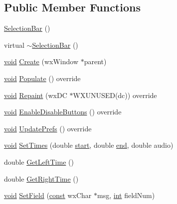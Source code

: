 \subsection*{Public Member Functions}
\begin{DoxyCompactItemize}
\item 
\hyperlink{class_selection_bar_a77f883e75a4fb5280f0a79ad17e8a549}{Selection\+Bar} ()
\item 
virtual \hyperlink{class_selection_bar_a216de1f19d68956a8b497d7d935e31f8}{$\sim$\+Selection\+Bar} ()
\item 
\hyperlink{sound_8c_ae35f5844602719cf66324f4de2a658b3}{void} \hyperlink{class_selection_bar_a9ee9a4f5516a7de59a2a10d3acc45302}{Create} (wx\+Window $\ast$parent)
\item 
\hyperlink{sound_8c_ae35f5844602719cf66324f4de2a658b3}{void} \hyperlink{class_selection_bar_aad76aa64d33dadda46eb02d2b326f66f}{Populate} () override
\item 
\hyperlink{sound_8c_ae35f5844602719cf66324f4de2a658b3}{void} \hyperlink{class_selection_bar_a9679aab7964d91a68105505c17cfcd90}{Repaint} (wx\+DC $\ast$W\+X\+U\+N\+U\+S\+ED(dc)) override
\item 
\hyperlink{sound_8c_ae35f5844602719cf66324f4de2a658b3}{void} \hyperlink{class_selection_bar_a5bb27fed7ba51a382a1b032247bbf9ab}{Enable\+Disable\+Buttons} () override
\item 
\hyperlink{sound_8c_ae35f5844602719cf66324f4de2a658b3}{void} \hyperlink{class_selection_bar_ada9ebc9106b6056dc284bfa099203d0c}{Update\+Prefs} () override
\item 
\hyperlink{sound_8c_ae35f5844602719cf66324f4de2a658b3}{void} \hyperlink{class_selection_bar_ae49fb2cbcf422fe4c719590013bacdc2}{Set\+Times} (double \hyperlink{seqread_8c_ac503262ae470564980711da4f78b1181}{start}, double \hyperlink{convtest_8m_afb358f48b1646c750fb9da6c6585be2b}{end}, double audio)
\item 
double \hyperlink{class_selection_bar_a1032e73abdeb1ffb0207b9e77fb47426}{Get\+Left\+Time} ()
\item 
double \hyperlink{class_selection_bar_a16e97a9bec7aff71b2006a84efc4467a}{Get\+Right\+Time} ()
\item 
\hyperlink{sound_8c_ae35f5844602719cf66324f4de2a658b3}{void} \hyperlink{class_selection_bar_ad71b950ee34c91327bbc65e4cbe53cc2}{Set\+Field} (\hyperlink{getopt1_8c_a2c212835823e3c54a8ab6d95c652660e}{const} wx\+Char $\ast$msg, \hyperlink{xmltok_8h_a5a0d4a5641ce434f1d23533f2b2e6653}{int} field\+Num)
\item 

\end{DoxyCompactItemize}
